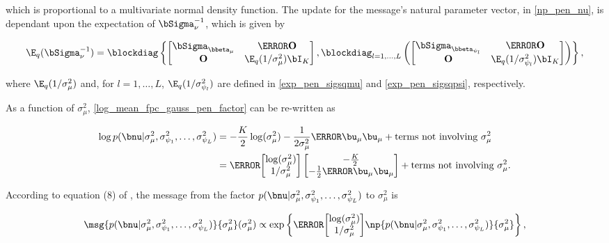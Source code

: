 \documentclass[12pt]{article}
\def\Sigmanu{\bSigma_{\nu}}
\def\sigsqmu{\sigma^2_{\mu}}
\def\betamu{\bbeta_\mu}
\def\umu{\bu_\mu}
\newcommand\betapsi[1]{\bbeta_{\psi_{#1}}}
\newcommand\sigsqpsi[1]{\sigma^2_{\psi_{#1}}}
\newcommand\tni[1]{\text{terms not involving $#1$}}
\theoremstyle{plain}
\theoremstyle{definition}
\theoremstyle{remark}
\begin{document}
\noindent which is proportional to a multivariate normal density function.
The update for the message's natural parameter vector, in \eqref{np_pen_nu},
is dependant upon the expectation of $\Sigmanu^{-1}$, which is given by

\[
	\E_q (\Sigmanu^{-1}) =
		\blockdiag \left\{
			\begin{bmatrix}
				\bSigma_{\betamu} & \T{\textbf{O}} \\
				\textbf{O} & \E_q (1/\sigsqmu) \bI_K
			\end{bmatrix},
			\blockdiag_{l = 1, \dots, L} \left(
				\begin{bmatrix}
					\bSigma_{\betapsi{l}} & \T{\textbf{O}} \\
					\textbf{O} & \E_q (1/\sigsqpsi{l}) \bI_K
				\end{bmatrix}
			\right)
		\right\},
\]

\noindent where $\E_q (1/\sigsqmu)$ and, for $l = 1, \dots, L$, $\E_q (1/\sigsqpsi{l})$ are defined in
\eqref{exp_pen_sigsqmu} and \eqref{exp_pen_sigsqpsi}, respectively.

As a function of $\sigsqmu$, \eqref{log_mean_fpc_gauss_pen_factor} can be re-written as

\begin{align*}
	\log p(\bnu | \sigsqmu, \sigsqpsi{1}, \dots, \sigsqpsi{L})
		& = -\frac{K}{2} \log (\sigsqmu) - \frac{1}{2\sigsqmu} \T{\umu} \umu + \tni{\sigsqmu} \\
		& = \T{\begin{bmatrix}
			\log (\sigsqmu) \\
			1/\sigsqmu
		\end{bmatrix}} \begin{bmatrix}
			-\frac{K}{2} \\
			-\frac12 \T{\umu} \umu
		\end{bmatrix} + \tni{\sigsqmu}.
\end{align*}

\noindent According to equation (8) of , the message from the factor $p(\bnu | \sigsqmu, \sigsqpsi{1}, \dots,
\sigsqpsi{L})$ to $\sigsqmu$ is

\[
	\msg{p (\bnu | \sigsqmu, \sigsqpsi{1}, \dots, \sigsqpsi{L})}{\sigsqmu} (\sigsqmu)
		\propto
			\exp \left\{
				\T{\begin{bmatrix}
					\log (\sigsqmu) \\
					1/\sigsqmu
				\end{bmatrix}} 
				\np{p (\bnu | \sigsqmu, \sigsqpsi{1}, \dots, \sigsqpsi{L})}{\sigsqmu}
			\right\},
\]
\end{document}
